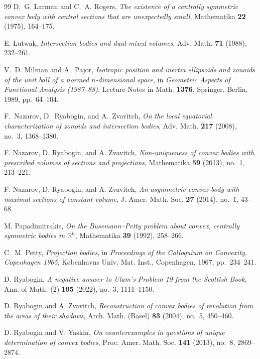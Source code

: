 \documentclass[11pt]{article}
\theoremstyle{remark}
\newcommand{\R}{\mathbb{R}}
\begin{document}
\begin{thebibliography}{99}
D.~G. Larman and C.~A. Rogers,
\emph{The existence of a centrally symmetric convex body with central
sections that are unexpectedly small},
Mathematika \textbf{22} (1975), 164--175.

E. Lutwak,
\emph{Intersection bodies and dual mixed volumes},
Adv. Math. \textbf{71} (1988), 232--261.


V.~D. Milman and A.~Pajor,
\emph{Isotropic position and inertia ellipsoids and zonoids of the unit ball
of a normed $n$-dimensional space},
in \emph{Geometric Aspects of Functional Analysis (1987--88)},
Lecture Notes in Math. \textbf{1376},
Springer, Berlin, 1989, pp.~64--104.

F.~Nazarov, D.~Ryabogin, and A.~Zvavitch,
\emph{On the local equatorial characterization of zonoids and
intersection bodies},
Adv. Math. \textbf{217} (2008), no.~3, 1368--1380.

F. Nazarov, D. Ryabogin, and A. Zvavitch,
\emph{Non-uniqueness of convex bodies with prescribed volumes of sections
and projections},
Mathematika \textbf{59} (2013), no.~1, 213--221.

F. Nazarov, D. Ryabogin, and A. Zvavitch,
\emph{An asymmetric convex body with maximal sections of constant volume},
J. Amer. Math. Soc. \textbf{27} (2014), no.~1, 43--68.



M. Papadimitrakis,
\emph{On the Busemann--Petty problem about convex, centrally symmetric
bodies in $\R^n$},
Mathematika \textbf{39} (1992), 258--266.

C.~M. Petty,
\emph{Projection bodies},
in \emph{Proceedings of the Colloquium on Convexity, Copenhagen 1965},
K\o benhavns Univ. Mat. Inst., Copenhagen, 1967, pp.~234--241.

D. Ryabogin,
\emph{A negative answer to Ulam's Problem 19 from the Scottish Book},
Ann. of Math. (2) \textbf{195} (2022), no.~3, 1111--1150.

D. Ryabogin and A. Zvavitch,
\emph{Reconstruction of convex bodies of revolution from the areas of
their shadows},
Arch. Math. (Basel) \textbf{83} (2004), no.~5, 450--460.


D. Ryabogin and V. Yaskin,
\emph{On counterexamples in questions of unique determination of convex
bodies},
Proc. Amer. Math. Soc. \textbf{141} (2013), no.~8, 2869--2874.




\end{thebibliography}
\end{document}
